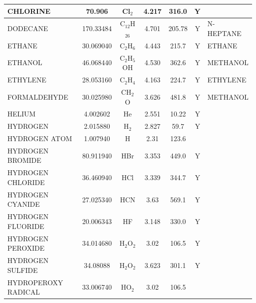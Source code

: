 \documentclass[11pt]{book}
\begin{document}
\begin{longtable}{@{\extracolsep{\fill}}|l|c|c|c|c|c|l|}
{\ct CHLORINE}           & 70.906     & Cl$_2$           & 4.217    & 316.0    &  Y       &                            \\ \hline
{\ct DODECANE}           & 170.33484  & C$_{12}$H$_{26}$     & 4.701    & 205.78   &  Y       &  {\ct N-HEPTANE}           \\ \hline
{\ct ETHANE}             & 30.069040  & C$_2$H$_6$       & 4.443    & 215.7    &  Y       &  {\ct ETHANE}              \\ \hline
{\ct ETHANOL}            & 46.068440  & C$_2$H$_5$OH     & 4.530    & 362.6    &  Y       &  {\ct METHANOL}            \\ \hline
{\ct ETHYLENE}           & 28.053160  & C$_2$H$_4$       & 4.163    & 224.7    &  Y       &  {\ct ETHYLENE}            \\ \hline
{\ct FORMALDEHYDE}       & 30.025980  & CH$_2$O          & 3.626    & 481.8    &  Y       &  {\ct METHANOL}            \\ \hline
{\ct HELIUM}             & 4.002602   & He               & 2.551    & 10.22    &  Y       &                            \\ \hline
{\ct HYDROGEN}           & 2.015880   & H$_2$            & 2.827    & 59.7     &  Y       &                            \\ \hline
{\ct HYDROGEN ATOM}      & 1.007940   & H                & 2.31     & 123.6    &          &                            \\ \hline
{\ct HYDROGEN BROMIDE}   & 80.911940  & HBr              & 3.353    & 449.0    &  Y       &                            \\ \hline
{\ct HYDROGEN CHLORIDE}  & 36.460940  & HCl              & 3.339    & 344.7    &  Y       &                            \\ \hline
{\ct HYDROGEN CYANIDE}   & 27.025340  & HCN              & 3.63     & 569.1    &  Y       &                            \\ \hline
{\ct HYDROGEN FLUORIDE}  & 20.006343  & HF               & 3.148    & 330.0    &  Y       &                            \\ \hline
{\ct HYDROGEN PEROXIDE}  & 34.014680  & H$_2$O$_2$       & 3.02     & 106.5    &  Y       &                            \\ \hline
{\ct HYDROGEN SULFIDE}   & 34.08088   & H$_2$O$_2$       & 3.623    & 301.1    &  Y       &                            \\ \hline
{\ct HYDROPEROXY RADICAL}& 33.006740  & HO$_2$           & 3.02     & 106.5    &          &                            \\ \hline

\end{longtable}
\end{document}

